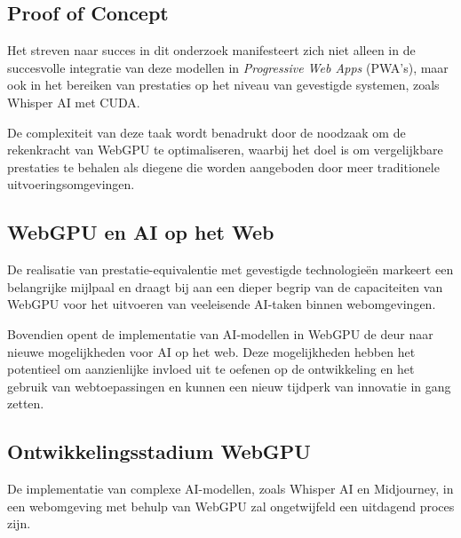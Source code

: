 

\subsection{Proof of Concept}
Het streven naar succes in dit onderzoek manifesteert zich niet alleen in de succesvolle integratie van deze modellen in \textit{Progressive Web Apps} (PWA's), maar ook in het bereiken van prestaties op het niveau van gevestigde systemen, zoals Whisper AI met CUDA.
 
\bigbreak{}
De complexiteit van deze taak wordt benadrukt door de noodzaak om de rekenkracht van WebGPU te optimaliseren, waarbij het doel is om vergelijkbare prestaties te behalen als diegene die worden aangeboden door meer traditionele uitvoeringsomgevingen. 

\subsection{WebGPU en AI op het Web}
De realisatie van prestatie-equivalentie met gevestigde technologieën markeert een belangrijke mijlpaal en draagt bij aan een dieper begrip van de capaciteiten van WebGPU voor het uitvoeren van veeleisende AI-taken binnen webomgevingen.

\bigbreak{}
Bovendien opent de implementatie van AI-modellen in WebGPU de deur naar nieuwe mogelijkheden voor AI op het web. Deze mogelijkheden hebben het potentieel om aanzienlijke invloed uit te oefenen op de ontwikkeling en het gebruik van webtoepassingen en kunnen een nieuw tijdperk van innovatie in gang zetten.

\subsection{Ontwikkelingsstadium WebGPU}
De implementatie van complexe AI-mo\-de\-llen, zoals Whisper AI en Midjourney, 
in een webomgeving met behulp van WebGPU zal ongetwijfeld een uitdagend proces zijn.

\bigbreak{}

